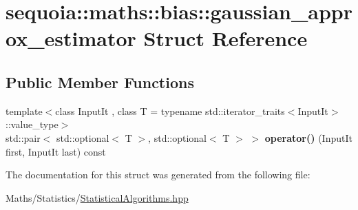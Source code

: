 \hypertarget{structsequoia_1_1maths_1_1bias_1_1gaussian__approx__estimator}{}\section{sequoia\+::maths\+::bias\+::gaussian\+\_\+approx\+\_\+estimator Struct Reference}
\label{structsequoia_1_1maths_1_1bias_1_1gaussian__approx__estimator}
\subsection*{Public Member Functions}
\begin{DoxyCompactItemize}
\item 
\mbox{\label{structsequoia_1_1maths_1_1bias_1_1gaussian__approx__estimator_af0ea79979f055d24706ad798d36c7b8e}} 
{\footnotesize template$<$class Input\+It , class T  = typename std\+::iterator\+\_\+traits$<$\+Input\+It$>$\+::value\+\_\+type$>$ }\\std\+::pair$<$ std\+::optional$<$ T $>$, std\+::optional$<$ T $>$ $>$ {\bfseries operator()} (Input\+It first, Input\+It last) const
\end{DoxyCompactItemize}


The documentation for this struct was generated from the following file\+:\begin{DoxyCompactItemize}
\item 
Maths/\+Statistics/\mbox{\hyperlink{_statistical_algorithms_8hpp}{Statistical\+Algorithms.\+hpp}}\end{DoxyCompactItemize}
